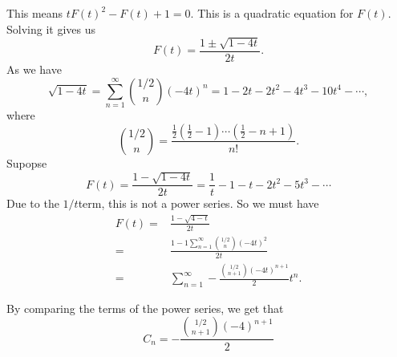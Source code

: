  This means $t F(t)^2 - F(t) +1 = 0.$
 This is a quadratic equation for $F(t).$
 Solving it gives us
 $$ F(t) = \frac{1 \pm \sqrt{1 - 4t}}{2t}. $$
 As we have $$ \sqrt{1 - 4t} =
 \sum_{n=1}^{\infty} \binom{1/2}{n} (-4t)^n
 = 1 - 2t - 2t^2 - 4t^3 - 10 t^4 - \cdots,
 $$ where $$ \binom{1/2}{n} = \frac{ \frac{1}{2} ( \frac{1}{2} - 1 )
\cdots ( \frac{1}{2} -n + 1)}{n!}.$$
Supopse 
$$ F(t) = \frac{1 - \sqrt{1 - 4t}}{2t}
 = \frac{1}{t} - 1 - t - 2t^2 - 5 t^3 - \cdots$$
Due to the $1/t$term, this is not a power series.
So we must have
\begin{align*}
	F(t) ={}& \frac{1 - \sqrt{4 - t}}{2t}\\
	={}& \frac{1 - 1 \sum_{n=1}^{\infty} \binom{1/2}{n} (-4t)^2}
	{2t} \\
	={}& \sum_{n=1}^{\infty}  - \frac{\binom{1/2}{n+1} (-4t)^{n+1}}{2} t^n.
\end{align*}

By comparing the terms of the power series, we get that
$$C_n = - \frac{\binom{1/2}{n+1} (-4)^{n+1} }{2} $$
